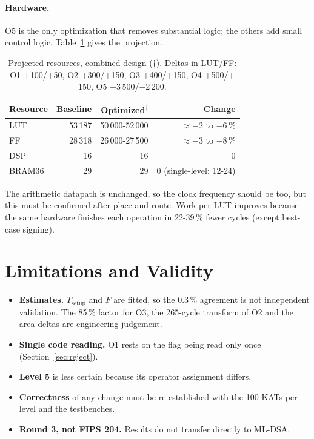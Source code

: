 \documentclass[12pt,a4paper]{report}
\newcommand{\est}{\textsuperscript{$\dagger$}}
\begin{document}
\paragraph{Hardware.}
O5 is the only optimization that removes substantial logic; the others add small control logic. Table~\ref{tab:final-hw} gives the projection.

\begin{table}[H]
\centering
\caption{Projected resources, combined design ($\dagger$). Deltas in LUT/FF: O1 $+$100/$+$50, O2 $+$300/$+$150, O3 $+$400/$+$150, O4 $+$500/$+$150, O5 $-$3\,500/$-$2\,200.}\label{tab:final-hw}
\begin{tabular}{@{}lrrr@{}}
\toprule
Resource & Baseline & Optimized\est & Change\\
\midrule
LUT  & 53\,187 & 50\,000-52\,000 & $\approx-$2 to $-$6\,\%\\
FF   & 28\,318 & 26\,000-27\,500 & $\approx-$3 to $-$8\,\%\\
DSP  & 16 & 16 & 0\\
BRAM36 & 29 & 29 & 0 (single-level: 12-24)\\
\bottomrule
\end{tabular}
\end{table}

The arithmetic datapath is unchanged, so the clock frequency should be too, but this must be confirmed after place and route. Work per LUT improves because the same hardware finishes each operation in 22-39\,\% fewer cycles (except best-case signing).

\section{Limitations and Validity}\label{sec:limits}
\begin{itemize}
  
  \item \textbf{Estimates.} $T_{\text{setup}}$ and $F$ are fitted, so the 0.3\,\% agreement is not independent validation. The 85\,\% factor for O3, the 265-cycle transform of O2 and the area deltas are engineering judgement.
  \item \textbf{Single code reading.} O1 rests on the flag being read only once (Section~\ref{sec:reject}).
  \item \textbf{Level 5} is less certain because its operator assignment differs.
  \item \textbf{Correctness} of any change must be re-established with the 100 KATs per level and the testbenches.
  \item \textbf{Round 3, not FIPS 204.} Results do not transfer directly to ML-DSA.
\end{itemize}
\end{document}

